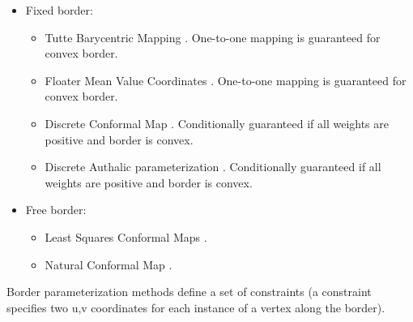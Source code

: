 \begin{itemize}

\item Fixed border:

    \begin{itemize}

    \item Tutte Barycentric Mapping \cite{t-hdg-63}.
    One-to-one mapping is guaranteed for convex border.

    \item Floater Mean Value Coordinates \cite{cgal:f-mvc-03}.
    One-to-one mapping is guaranteed for convex border.

    \item Discrete Conformal Map \cite{cgal:eddhls-maam-95}.
    Conditionally guaranteed if all weights are positive and border is convex.

    \item Discrete Authalic parameterization \cite{cgal:dma-ipsm-02}.
    Conditionally guaranteed if all weights are positive and border is convex.

    \end{itemize}

\item Free border:

    \begin{itemize}

    \item Least Squares Conformal Maps \cite{cgal:lprm-lscm-02}.

    \item Natural Conformal Map \cite{cgal:dma-ipsm-02}.

    \end{itemize}

\end{itemize}



Border parameterization methods define a
set of constraints (a constraint specifies two u,v coordinates for
each instance of a vertex along the border).

